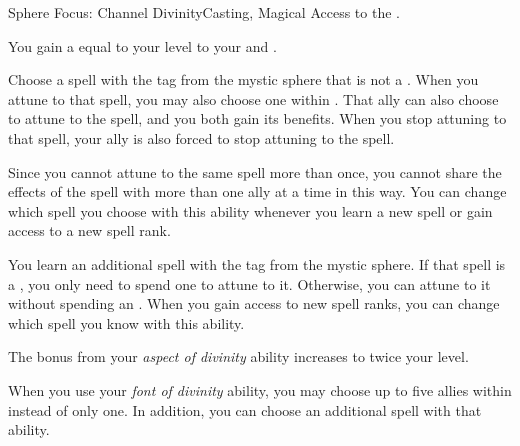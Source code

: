     \begin{feat}{Sphere Focus: Channel Divinity}{Casting, Magical}
        \featpre Access to the  .

         You gain a  equal to your level to your  and .

         Choose a spell with the  tag from the  mystic sphere that is not a .
        When you attune to that spell, you may also choose one  within \medrange.
        That ally can also choose to attune to the spell, and you both gain its benefits.
        When you stop attuning to that spell, your ally is also forced to stop attuning to the spell.

        Since you cannot attune to the same spell more than once, you cannot share the effects of the spell with more than one ally at a time in this way.
        You can change which spell you choose with this ability whenever you learn a new spell or gain access to a new spell rank.

         You learn an additional spell with the  tag from the  mystic sphere.
        If that spell is a , you only need to spend one  to attune to it.
        Otherwise, you can attune to it without spending an .
        When you gain access to new spell ranks, you can change which spell you know with this ability.

         The bonus from your \textit{aspect of divinity} ability increases to twice your level.

         When you use your \textit{font of divinity} ability, you may choose up to five allies within \medrange instead of only one.
        In addition, you can choose an additional spell with that ability.
    \end{feat}

